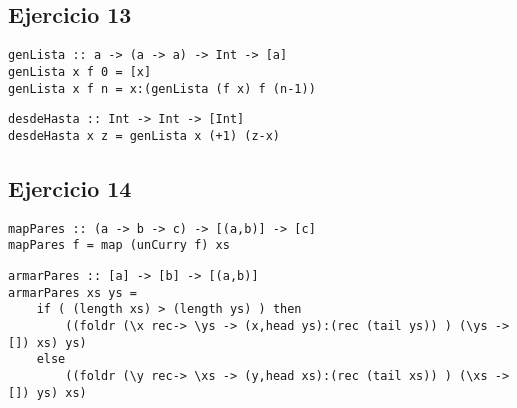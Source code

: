 \subsection{Ejercicio 13}
\begin{centrado}
	\begin{verbatim}
genLista :: a -> (a -> a) -> Int -> [a]
genLista x f 0 = [x]
genLista x f n = x:(genLista (f x) f (n-1))
	\end{verbatim}
\end{centrado}

\begin{centrado}
	\begin{verbatim}
desdeHasta :: Int -> Int -> [Int]
desdeHasta x z = genLista x (+1) (z-x)
	\end{verbatim}
\end{centrado}

\subsection{Ejercicio 14}
\begin{centrado}
\begin{verbatim}
mapPares :: (a -> b -> c) -> [(a,b)] -> [c]
mapPares f = map (unCurry f) xs
\end{verbatim}
\end{centrado}
\begin{centrado}
	\begin{verbatim}
armarPares :: [a] -> [b] -> [(a,b)]
armarPares xs ys = 
	if ( (length xs) > (length ys) ) then 
		((foldr (\x rec-> \ys -> (x,head ys):(rec (tail ys)) ) (\ys -> []) xs) ys)
	else 
		((foldr (\y rec-> \xs -> (y,head xs):(rec (tail xs)) ) (\xs -> []) ys) xs)
	\end{verbatim}
\end{centrado}

%
%	
%			
%
